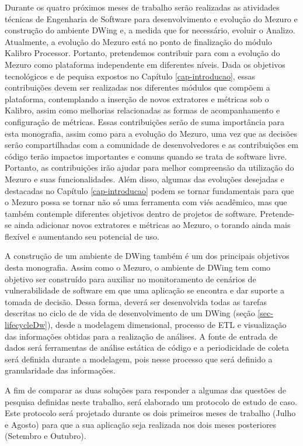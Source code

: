Durante os quatro próximos meses de trabalho serão realizadas as atividades técnicas de Engenharia de Software para desenvolvimento e evolução do Mezuro e construção do ambiente DWing e, a medida que for necessário, evoluir o Analizo. Atualmente, a evolução do Mezuro está no ponto de finalização do módulo Kalibro Processor. Portanto, pretendemos contribuir para com a evolução do Mezuro como plataforma independente em diferentes níveis. Dada os objetivos tecnológicos e de pequisa expostos no Capítulo \ref{cap-introducao}, essas contribuições devem ser realizadas nos diferentes módulos que compõem a plataforma, contemplando a inserção de novos extratores e métricas sob o Kalibro, assim como melhorias relacionadas as formas de acompanhamento e configuração de métricas. Essas contribuições serão de suma importância para esta monografia, assim como para a evolução do Mezuro, uma vez que as decisões serão compartilhadas com a comunidade de desenvolvedores e as contribuições em código terão impactos importantes e comuns quando se trata de software livre. Portanto, as contribuições irão ajudar para melhor compreensão da utilização do Mezuro e suas funcionalidades. Além disso, algumas das evoluções desejadas e destacadas no Capítulo \ref{cap-introducao} podem se tornar fundamentais para que o Mezuro possa se tornar não só uma ferramenta com viés acadêmico, mas que também contemple diferentes objetivos dentro de projetos de software. Pretende-se ainda adicionar novos extratores e métricas ao Mezuro, o torando ainda mais flexível e aumentando seu potencial de uso.

%

A construção de um ambiente de DWing também é um dos principais objetivos desta monografia. Assim como o Mezuro, o ambiente de DWing tem como objetivo ser construído para auxiliar no monitoramento de cenários de vulnerabilidade de software em que uma aplicação se encontra e dar suporte a tomada de decisão. Dessa forma, deverá ser desenvolvida todas as tarefas descritas no ciclo de de vida de desenvolvimento de um DWing (seção \ref{sec-lifecycleDw}), desde a modelagem dimensional, processo de ETL e visualização das informações obtidas para a realização de análises. A fonte de entrada de dados será ferramentas de análise estática de código e a periodicidade de coleta será definida durante a modelagem, pois nesse processo que será definido a granularidade das informações.

%

A fim de comparar as duas soluções para responder a algumas das questões de pesquisa definidas neste trabalho, será elaborado um protocolo de estudo de caso. Este protocolo será projetado durante os dois primeiros meses de trabalho (Julho e Agosto) para que a sua aplicação seja realizada nos dois meses posteriores (Setembro e Outubro).

